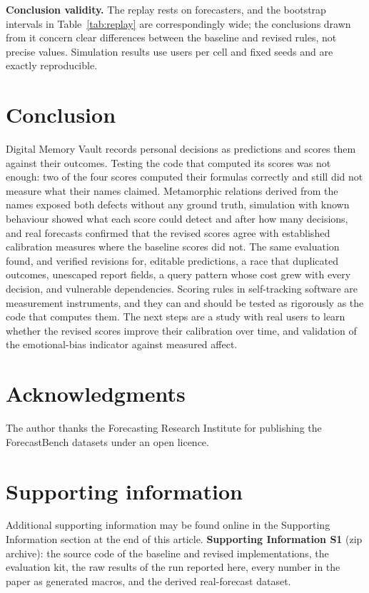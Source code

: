 \documentclass[12pt,a4paper]{article}
\begin{document}
\textbf{Conclusion validity.} The replay rests on \ReplayForecasters{} forecasters, and the bootstrap intervals in Table~\ref{tab:replay} are correspondingly wide; the conclusions drawn from it concern clear differences between the baseline and revised rules, not precise values. Simulation results use \PowerReps{} users per cell and fixed seeds and are exactly reproducible.

\section{Conclusion}\label{sec:conclusion}

Digital Memory Vault records personal decisions as predictions and scores them against their outcomes. Testing the code that computed its scores was not enough: two of the four scores computed their formulas correctly and still did not measure what their names claimed. Metamorphic relations derived from the names exposed both defects without any ground truth, simulation with known behaviour showed what each score could detect and after how many decisions, and real forecasts confirmed that the revised scores agree with established calibration measures where the baseline scores did not. The same evaluation found, and verified revisions for, editable predictions, a race that duplicated outcomes, unescaped report fields, a query pattern whose cost grew with every decision, and vulnerable dependencies. Scoring rules in self-tracking software are measurement instruments, and they can and should be tested as rigorously as the code that computes them. The next steps are a study with real users to learn whether the revised scores improve their calibration over time, and validation of the emotional-bias indicator against measured affect.



\section*{Acknowledgments}
The author thanks the Forecasting Research Institute for publishing the ForecastBench datasets under an open licence.

\section*{Supporting information}
Additional supporting information may be found online in the Supporting Information section at the end of this article. \textbf{Supporting Information S1} (zip archive): the source code of the baseline and revised implementations, the evaluation kit, the raw results of the run reported here, every number in the paper as generated macros, and the derived real-forecast dataset.
\end{document}

